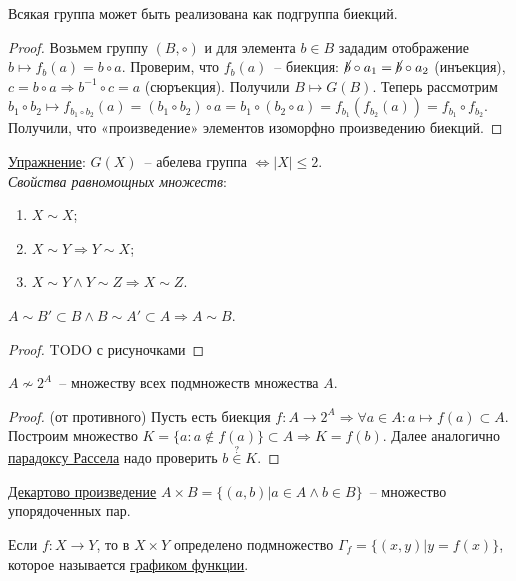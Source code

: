 \begin{theo}[Кэли]
	Всякая группа может быть реализована как подгруппа биекций.
\end{theo}
\begin{proof}
	Возьмем группу $(B, \circ)$ и для элемента $b \in B$ зададим отображение $b \mapsto f_b(a)=b \circ a$. Проверим, что $ f_b(a)$~-- биекция: $\cancel{b} \circ a_1 = \cancel{b} \circ a_2$ (инъекция), $c = b \circ a \Rightarrow b^{-1} \circ c = a$ (сюръекция). Получили $B \mapsto G(B)$. Теперь рассмотрим $b_1 \circ b_2 \mapsto f_{b_1 \circ b_2}(a) = (b_1 \circ b_2) \circ a = b_1 \circ (b_2 \circ a) = f_{b_1}(f_{b_2}(a)) = f_{b_1} \circ f_{b_2}$. Получили, что «произведение» элементов изоморфно произведению биекций.
\end{proof}

\underline{Упражнение}: $G(X)$~-- абелева группа $\Leftrightarrow |X| \le 2$.\\

\textit{Свойства равномощных множеств}:
\begin{enumerate}
	\item $X \sim X$;
	\item $X \sim Y \Rightarrow Y \sim X$;
	\item $X \sim Y \land Y \sim Z \Rightarrow X \sim Z$.
\end{enumerate}

\begin{theo}
	$A \sim B' \subset B \land B \sim A' \subset A \Rightarrow A \sim B$.
\end{theo}
\begin{proof}
	TODO с рисуночками
\end{proof}

\begin{theo}[Кантора]
	$A \not \sim 2^A$~-- множеству всех подмножеств множества $A$.
\end{theo}
\begin{proof}
	(от противного) Пусть есть биекция $f: A \to 2^A \Rightarrow \forall a \in A: a \mapsto f(a) \subset A$. Построим множество $K = \{a: a \not \in f(a)\} \subset A \Rightarrow K=f(b)$. Далее аналогично \hyperref[russel_paradox]{парадоксу Рассела} надо проверить $b \overset{?}{\in} K$.
\end{proof}

\begin{defin}
	\underline{Декартово произведение} $A \times B = \{(a,b) | a \in A \land b \in B\}$~-- множество упорядоченных пар.
\end{defin}
\begin{defin}
	Если $f: X \to Y$, то в $X \times Y$ определено подмножество $\Gamma_f = \{(x,y) | y=f(x)\}$, которое называется \underline{графиком функции}.
\end{defin}

